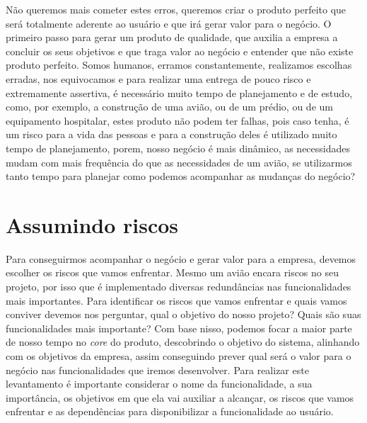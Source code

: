     Não queremos mais cometer estes erros, queremos criar o produto perfeito que
    será totalmente aderente ao usuário e que irá gerar valor para o negócio. O
    primeiro passo para gerar um produto de qualidade, que auxilia a empresa a
    concluir os seus objetivos e que traga valor ao negócio e entender que não
    existe produto perfeito. Somos humanos, erramos constantemente, realizamos
    escolhas erradas, nos equivocamos e para realizar uma entrega de pouco risco
    e extremamente assertiva, é necessário muito tempo de planejamento e de estudo,
    como, por exemplo, a construção de uma avião, ou de um prédio, ou de um equipamento
    hospitalar, estes produto não podem ter falhas, pois caso tenha, é um risco
    para a vida das pessoas e para a construção deles é utilizado muito tempo de
    planejamento, porem, nosso negócio é mais dinâmico, as necessidades mudam com
    mais frequência do que as necessidades de um avião, se utilizarmos tanto tempo
    para planejar como podemos acompanhar as mudanças do negócio?

    \section{Assumindo riscos}
      Para conseguirmos acompanhar o negócio e gerar valor para a empresa, devemos
      escolher os riscos que vamos enfrentar. Mesmo um avião encara riscos no seu
      projeto, por isso que é implementado diversas redundâncias nas funcionalidades
      mais importantes. Para identificar os riscos que vamos enfrentar e quais vamos
      conviver devemos nos perguntar, qual o objetivo do nosso projeto? Quais são
      suas funcionalidades mais importante? \newline
      Com base nisso, podemos focar a maior parte de nosso tempo no \textit{core}
      do produto, descobrindo o objetivo do sistema, alinhando com os objetivos
      da empresa, assim conseguindo prever qual será o valor para o negócio nas
      funcionalidades que iremos desenvolver. Para realizar este levantamento é
      importante considerar o nome da funcionalidade, a sua importância, os objetivos
      em que ela vai auxiliar a alcançar, os riscos que vamos enfrentar e as dependências
      para disponibilizar a funcionalidade ao usuário. \newline

